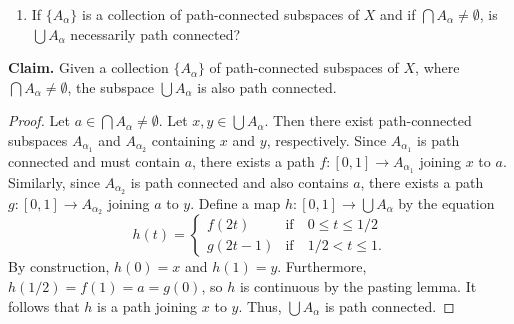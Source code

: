 %
  \begin{enumerate}[label={(\alph*)}, align=left, leftmargin=\parindent, listparindent=\parindent, labelwidth=0pt, itemindent=!]
    \addtocounter{enumi}{3} 
    \item 
      If $\{A_\alpha\}$ is a collection of path-connected subspaces of $X$ and if $\bigcap A_\alpha \neq \emptyset$, is $\bigcup A_\alpha$ necessarily path connected?
  \end{enumerate}
  \textbf{Claim.} Given a collection $\{A_\alpha\}$ of path-connected subspaces of $X$, where $\bigcap A_\alpha \neq \emptyset$, the subspace $\bigcup A_\alpha$ is also path connected.
  \begin{proof}
    Let $a \in \bigcap A_\alpha \neq \emptyset$.
    Let $x, y \in \bigcup A_\alpha$.
    Then there exist path-connected subspaces $A_{\alpha_1}$ and $A_{\alpha_2}$ containing $x$ and $y$, respectively.
    Since $A_{\alpha_1}$ is path connected and must contain $a$, there exists a path $f: [0, 1] \rightarrow A_{\alpha_1}$ joining $x$ to $a$.
    Similarly, since $A_{\alpha_2}$ is path connected and also contains $a$, there exists a path $g: [0, 1] \rightarrow A_{\alpha_2}$ joining $a$ to $y$.
    Define a map $h: [0, 1] \rightarrow \bigcup A_\alpha$ by the equation
    \begin{equation*}
      h(t) =
      \begin{cases}
        f(2t)     & \text{if} \quad 0 \leq t \leq 1/2 \\
        g(2t - 1) & \text{if} \quad 1/2 < t \leq 1.
      \end{cases}
    \end{equation*}
    By construction, $h(0) = x$ and $h(1) = y$.
    Furthermore, $h(1/2) = f(1) = a = g(0)$, so $h$ is continuous by the pasting lemma.
    It follows that $h$ is a path joining $x$ to $y$.
    Thus, $\bigcup A_\alpha$ is path connected.
  \end{proof}
\newpage

